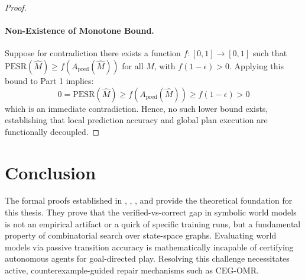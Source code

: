 \documentclass[11pt,a4paper]{article}
\theoremstyle{definition}
\theoremstyle{remark}
\begin{document}
\begin{proof}
\paragraph{Non-Existence of Monotone Bound.}
Suppose for contradiction there exists a function $f: [0, 1] \to [0, 1]$ such that $\text{PESR}(\widehat{M}) \ge f(A_{\text{pred}}(\widehat{M}))$ for all $\widehat{M}$, with $f(1-\epsilon) > 0$.
Applying this bound to Part 1 implies:
\begin{equation}
    0 = \text{PESR}(\widehat{M}) \ge f(A_{\text{pred}}(\widehat{M})) \ge f(1 - \epsilon) > 0
\end{equation}
which is an immediate contradiction. Hence, no such lower bound exists, establishing that local prediction accuracy and global plan execution are functionally decoupled.
\end{proof}

\section{Conclusion}

The formal proofs established in , , , and  provide the theoretical foundation for this thesis. They prove that the verified-vs-correct gap in symbolic world models is not an empirical artifact or a quirk of specific training runs, but a fundamental property of combinatorial search over state-space graphs. Evaluating world models via passive transition accuracy is mathematically incapable of certifying autonomous agents for goal-directed play. Resolving this challenge necessitates active, counterexample-guided repair mechanisms such as CEG-OMR.
\end{document}
